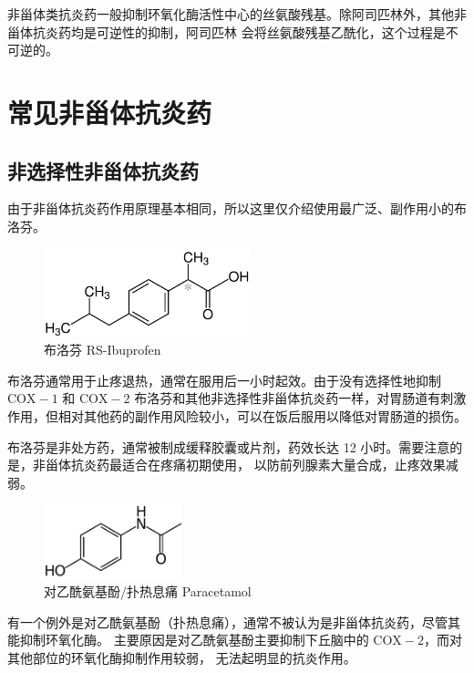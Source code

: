 \documentclass[12pt, a4paper, oneside]{ctexart}
\begin{document}
非甾体类抗炎药一般抑制环氧化酶活性中心的丝氨酸残基。除阿司匹林外，其他非甾体抗炎药均是可逆性的抑制，阿司匹林
会将丝氨酸残基乙酰化，这个过程是不可逆的。

\newpage
\section{常见非甾体抗炎药}
\subsection{非选择性非甾体抗炎药}
由于非甾体抗炎药作用原理基本相同，所以这里仅介绍使用最广泛、副作用小的布洛芬。

\begin{figure}[htbp]
    \centering
    \includegraphics[width=6cm]{RS_-Ibuprofen_Structural_Formula_V1.pdf}
    \caption{布洛芬 RS-Ibuprofen}
\end{figure} 

布洛芬通常用于止疼退热，通常在服用后一小时起效。由于没有选择性地抑制  $\mathrm{COX-1}$ 和 $\mathrm{COX-2}$ 
布洛芬和其他非选择性非甾体抗炎药一样，对胃肠道有刺激作用，但相对其他药的副作用风险较小，可以在饭后服用以降低对胃肠道的损伤。

布洛芬是非处方药，通常被制成缓释胶囊或片剂，药效长达 12 小时。需要注意的是，非甾体抗炎药最适合在疼痛初期使用，
以防前列腺素大量合成，止疼效果减弱。

\begin{figure}[htbp]
    \centering
    \includegraphics[width=4cm]{Paracetamol-skeletal.pdf}
    \caption{对乙酰氨基酚/扑热息痛 Paracetamol}
\end{figure} 

有一个例外是对乙酰氨基酚（扑热息痛），通常不被认为是非甾体抗炎药，尽管其能抑制环氧化酶。
主要原因是对乙酰氨基酚主要抑制下丘脑中的 $\mathrm{COX-2}$，而对其他部位的环氧化酶抑制作用较弱，
无法起明显的抗炎作用。

\end{document}
